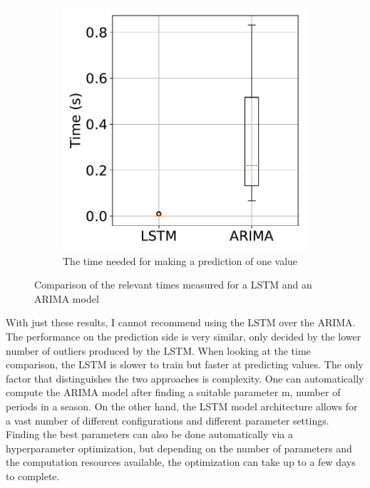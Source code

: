 \begin{figure}
\begin{subfigure}{0.4\linewidth}
		\includegraphics[width=1\linewidth]{Pictures/TimeComp/PredictionTime}
		\caption{The time needed for making a prediction of one value}
		\label{fig:BoxPrediction}
	\end{subfigure}
	\caption{Comparison of the relevant times measured for a LSTM and an ARIMA model}
	\label{fig:Times}
\end{figure}

With just these results, I cannot recommend using the LSTM over the ARIMA.
The performance on the prediction side is very similar, only decided by the lower number of outliers produced by the LSTM.
When looking at the time comparison, the LSTM is slower to train but faster at predicting values.
The only factor that distinguishes the two approaches is complexity.
One can automatically compute the ARIMA model after finding a suitable parameter m, number of periods in a season.
On the other hand, the LSTM model architecture allows for a vast number of different configurations and different parameter settings.
Finding the best parameters can also be done automatically via a hyperparameter optimization, but depending on the number of parameters and the computation resources available, the optimization can take up to a few days to complete.

